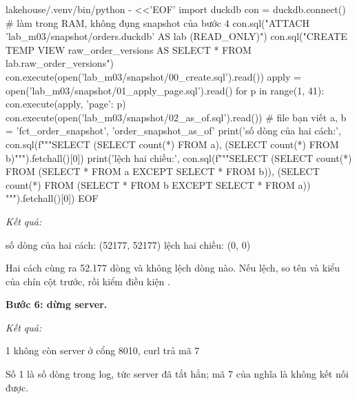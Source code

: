 \begin{codeblock}
lakehouse/.venv/bin/python - <<'EOF'
import duckdb
con = duckdb.connect()  # làm trong RAM, không đụng snapshot của bước 4
con.sql("ATTACH 'lab_m03/snapshot/orders.duckdb' AS lab (READ_ONLY)")
con.sql("CREATE TEMP VIEW raw_order_versions AS SELECT * FROM lab.raw_order_versions")
con.execute(open('lab_m03/snapshot/00_create.sql').read())
apply = open('lab_m03/snapshot/01_apply_page.sql').read()
for p in range(1, 41):
    con.execute(apply, {'page': p})
con.execute(open('lab_m03/snapshot/02_as_of.sql').read())  # file bạn viết
a, b = 'fct_order_snapshot', 'order_snapshot_as_of'
print('số dòng của hai cách:', con.sql(f"""SELECT (SELECT count(*) FROM {a}),
  (SELECT count(*) FROM {b})""").fetchall()[0])
print('lệch hai chiều:', con.sql(f"""SELECT
  (SELECT count(*) FROM (SELECT * FROM {a} EXCEPT SELECT * FROM {b})),
  (SELECT count(*) FROM (SELECT * FROM {b} EXCEPT SELECT * FROM {a}))
  """).fetchall()[0])
EOF
\end{codeblock}
\textit{Kết quả:}
\begin{codeblock}
số dòng của hai cách: (52177, 52177)
lệch hai chiều: (0, 0)
\end{codeblock}

Hai cách cùng ra 52.177 dòng và không lệch dòng nào. Nếu lệch, so tên và kiểu của chín cột trước, rồi kiểm điều kiện .

\textbf{Bước 6: dừng server.}

\textit{Kết quả:}
\begin{codeblock}
1
không còn server ở cổng 8010, curl trả mã 7
\end{codeblock}

Số 1 là số dòng  trong log, tức server đã tắt hẳn; mã 7 của  nghĩa là không kết nối được.


